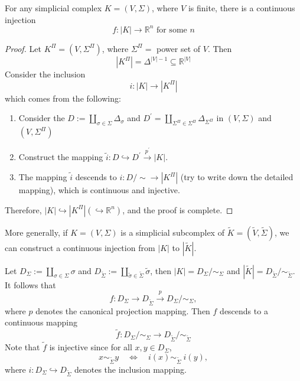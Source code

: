 \begin{proposition} For any simplicial complex \(K = \left( {V,\Sigma }\right)\), where \(V\) is finite, there is a continuous injection
\[
f: \left| K\right|  \rightarrow  {\mathbb{R}}^{n}\text{ for some }n
\]
\end{proposition}

\begin{proof} Let \(K^{\Pi} = \left( {V,\Sigma^{\Pi}}\right)\), where \(\Sigma^{\Pi} =\) power set of \(V\). Then
\[
\left| K^{\Pi}\right|  = {\Delta }^{\left| V\right|  - 1} \subseteq  {\mathbb{R}}^{\left| V\right| }
\]
Consider the inclusion
\[
i: \left| K\right|  \rightarrow  \left| K^{\Pi}\right|
\]
which comes from the following:
\begin{enumerate}
    \item Consider the \(D \mathrel{\text{:= }} \mathop{\coprod }\limits_{{\sigma  \in  \Sigma }}{\Delta }_{\sigma }\) and \({D}^{\prime } = \mathop{\coprod }\limits_{{\Sigma^{\Pi} \in  \Sigma^{\Pi}}}{\Delta }_{\Sigma^{\Pi}}\) in \(\left( {V,\Sigma }\right)\) and \(\left( {V,\Sigma^{\Pi}}\right)\)

\item Construct the mapping \(\widetilde{i}: D \hookrightarrow  {D}^{\prime }\overset{{p}^{\prime }}{ \rightarrow  }\left| K\right|\).

\item The mapping \(\widetilde{i}\) descends to \(i: D/ \sim   \rightarrow  \left| K^{\Pi}\right|\) (try to write down the detailed mapping), which is continuous and injective.
\end{enumerate}
Therefore, \(\left| K\right|  \hookrightarrow  \left| K^{\Pi}\right|  (\hookrightarrow  {\mathbb{R}}^{n})\), and the proof is complete.
\end{proof}

\begin{remark} 
More generally, if \(K = \left( V,\Sigma \right)\) is a simplicial subcomplex of \(\widetilde{K} = \left( {\widetilde{V},\widetilde{\Sigma}}\right)\), we can construct a continuous injection from \(\left| K\right|\) to \(\left| \widetilde{K}\right|\).

Let \({D}_{\Sigma } \mathrel{\text{:= }} \mathop{\coprod }\limits_{{\sigma  \in  \Sigma }}\sigma\) and \({D}_{\widetilde{\Sigma}} \mathrel{\text{:= }} \mathop{\coprod }\limits_{{\widetilde{\sigma} \in  \widetilde{\Sigma}}}\widetilde{\sigma}\), then \(\left| K\right|  = {D}_{\Sigma }/{ \sim  }_{\Sigma }\) and \(\left| \widetilde{K}\right|  = {D}_{\widetilde{\Sigma}}/{ \sim  }_{\widetilde{\Sigma}}\). It follows that
\[f:  {D}_{\Sigma } \rightarrow {D}_{\widetilde{\Sigma}} 
\overset{p}{ \rightarrow  }{D}_{\Sigma }/{ \sim  }_{\Sigma },\] 
where $p$ denotes the canonical projection mapping. Then \(f\) descends to a continuous mapping
\[
\widetilde{f}: {D}_{\Sigma }/{ \sim  }_{\Sigma } \rightarrow {D}_{\widetilde{\Sigma}}/{ \sim  }_{\widetilde{\Sigma}}
\]
Note that \(\widetilde{f}\) is injective since for all $x,y \in  {D}_{\Sigma }$,
\[
x{ \sim  }_{\widetilde{\Sigma}}y \quad \Leftrightarrow  \quad i\left( x\right) { \sim  }_{\widetilde{\Sigma}}\ i\left( y\right),
\]
where \(i: D_{\Sigma} \hookrightarrow D_{\widetilde{\Sigma}}\) denotes the inclusion mapping.
\end{remark}


